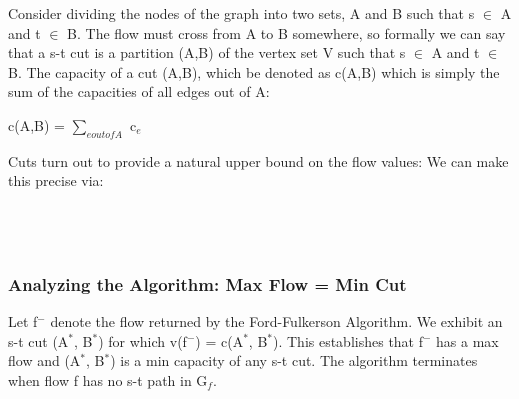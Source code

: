 \documentclass{article}
\begin{document}
Consider dividing the nodes of the graph into two sets, A and B such that s $\in$ A and t $\in$ B. The flow must cross from A to B somewhere, so formally we can say that a s-t cut is a partition (A,B) of the vertex set V such that s $\in$ A and t $\in$ B. The capacity of a cut (A,B), which be denoted as c(A,B) which is simply the sum of the capacities of all edges out of A:\\

\begin{center}
c(A,B) = $\sum_{e out of A}$ c$_e$
\end{center}

Cuts turn out to provide a natural upper bound on the flow values: We can make this precise via:\\

\\

\\

\\

\subsubsection{Analyzing the Algorithm: Max Flow = Min Cut}
Let f$^-$ denote the flow returned by the Ford-Fulkerson Algorithm. We exhibit an s-t cut (A$^\ast$, B$^\ast$) for which v(f$^-$) = c(A$^*$, B$^*$). This establishes that f$^-$ has a max flow and (A$^*$, B$^*$) is a min capacity of any s-t cut. The algorithm terminates when flow f has no s-t path in G$_f$.\\
\end{document}

